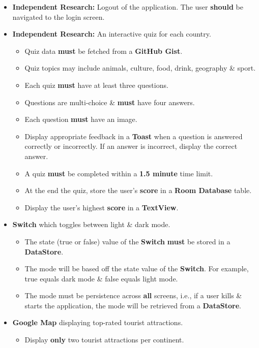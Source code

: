 \documentclass{article}
\begin{document}
\begin{itemize}
	\item \textbf{Independent Research:} Logout of the application. The user \textbf{should} be navigated to the login screen.
	\item \textbf{Independent Research:} An interactive quiz for each country.
	      \begin{itemize}
	      	\item Quiz data \textbf{must} be fetched from a \textbf{GitHub Gist}.
	      	\item Quiz topics may include animals, culture, food, drink, geography \& sport.
	      	\item Each quiz \textbf{must} have at least three questions.
	      	\item Questions are multi-choice \& \textbf{must} have four answers.
	      	\item Each question \textbf{must} have an image.
	      	\item Display appropriate feedback in a \textbf{Toast} when a question is answered correctly or incorrectly. If an answer is incorrect, display the correct answer.
	      	\item A quiz \textbf{must} be completed within a \textbf{1.5 minute} time limit.
	      	\item At the end the quiz, store the user's \textbf{score} in a \textbf{Room Database} table.
	      	\item Display the user's highest \textbf{score} in a \textbf{TextView}.
	      \end{itemize}
	\item \textbf{Switch} which toggles between light \& dark mode.
	      \begin{itemize}
	      	\item The state (true or false) value of the \textbf{Switch} \textbf{must} be stored in a \textbf{DataStore}.
	      	\item The mode will be based off the state value of the \textbf{Switch}. For example, true equals dark mode \& false equals light mode.
	      	\item The mode must be persistence across \textbf{all} screens, i.e., if a user kills \& starts the application, the mode will be retrieved from a \textbf{DataStore}.
	      \end{itemize}
	\item \textbf{Google Map} displaying top-rated tourist attractions. 
	      \begin{itemize}
			\item Display \textbf{only} two tourist attractions per continent.

\end{itemize}
\end{itemize}
\end{document}
